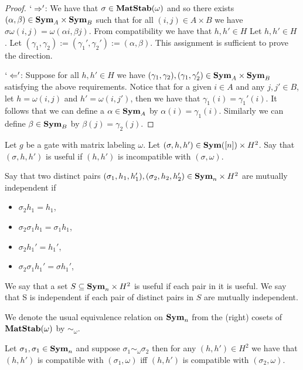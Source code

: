 \documentclass[../paper.tex]{subfiles}
\begin{document}
\begin{proof}
  $`\Rightarrow'$: We have that $\sigma \in \text{\textbf{MatStab}}(\omega)$ and so there
  exists $(\alpha, \beta) \in \text{\textbf{Sym}}_A \times \text{\textbf{Sym}}_B$ such that for all $(i,j) \in
  A \times B$ we have $\sigma \omega (i,j) = \omega (\alpha i, \beta j)$. From
  compatibility we have that $h,h' \in H$ Let $h, h' \in H$ . Let $(\gamma_1,
  \gamma_2) := (\gamma_1', \gamma_2') := (\alpha, \beta)$. This assignment is
  sufficient to prove the direction.

  $`\Leftarrow'$: Suppose for all $h,h' \in H$ we have $(\gamma_1, \gamma_2),
  (\gamma_1, \gamma_2') \in \text{\textbf{Sym}}_A \times \text{\textbf{Sym}}_B$ satisfying the above
  requirements. Notice that for a given $i \in A$ and any $j, j' \in B$, let $h
  = \omega(i,j)$ and $h' = \omega(i,j')$, then we have that $\gamma_1 (i) =
  \gamma_1'(i)$. It follows that we can define a $\alpha \in \text{\textbf{Sym}}_A$ by
  $\alpha(i) = \gamma_1 (i)$. Similarly we can define $\beta \in \text{\textbf{Sym}}_B$ by
  $\beta (j) = \gamma_2 (j)$.

\end{proof}

\begin{definition}
  Let $g$ be a gate with matrix labeling $\omega$. Let $(\sigma, h, h') \in
  \text{\textbf{Sym}}([n]) \times H^2$. Say that $(\sigma, h, h')$ is useful if $(h,h')$ is
  incompatible with $(\sigma, \omega)$.

  Say that two distinct pairs $(\sigma_1, h_1, h_1'), (\sigma_2, h_2, h_2') \in
  \text{\textbf{Sym}}_n\times H^2$ are mutually independent if
  \begin{itemize}
    \setlength\itemsep{0mm}
  \item $\sigma_2 h_1 = h_1$,
  \item $\sigma_2 \sigma_1 h_1 = \sigma_1 h_1$,
  \item $\sigma_2 h_1' = h_1'$,
  \item $\sigma_2 \sigma_1 h_1' = \sigma h_1'$,
  \end{itemize}
  We say that a set $S \subseteq \text{\textbf{Sym}}_n \times H^2$ is useful if each pair in it
  is useful. We say that S is independent if each pair of distinct pairs in $S$
  are mutually independent.
\end{definition}

We denote the usual equivalence relation on $\text{\textbf{Sym}}_n$ from the (right) cosets of
$\text{\textbf{MatStab}}(\omega)$ by $\sim_\omega$.

\begin{lem}
  Let $\sigma_1, \sigma_1 \in \text{\textbf{Sym}}_n$ and suppose $\sigma_1 \sim_\omega
  \sigma_2$ then for any $(h,h') \in H^2$ we have that $(h,h')$ is compatible
  with $(\sigma_1, \omega)$ iff $(h,h')$ is compatible with $(\sigma_2,
  \omega)$.
\end{lem}
\end{document}
